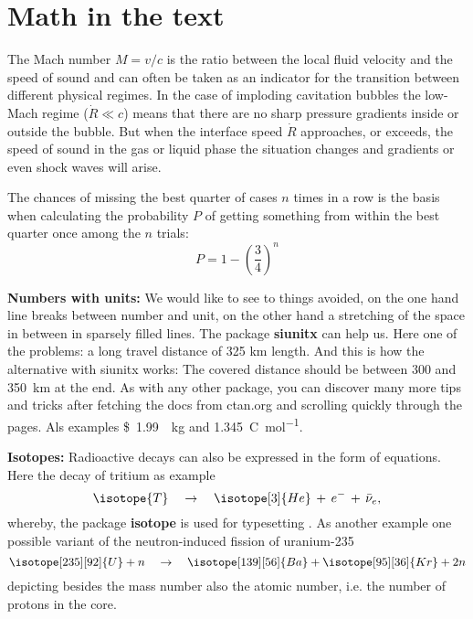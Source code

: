 \chapter{Math in the text}%

The Mach number $M=v/c$ is the ratio between the local fluid velocity and the speed of sound and can often be taken as an indicator for the transition between different physical regimes. In the case of imploding cavitation bubbles the low-Mach regime ($\dot{R}\ll c$) means that there are no sharp pressure gradients inside or outside the bubble. But when the interface speed $\dot{R}$ approaches, or exceeds, the speed of sound in the gas or liquid phase the situation changes and gradients or even shock waves will arise.

The chances of missing the best quarter of cases $n$ times in a row is the basis when calculating the probability $P$ of getting something from within the best quarter once among the $n$ trials:
\begin{equation}
P=1-\left( \frac{3}{4} \right)^n
\end{equation}


\textbf{Numbers with units:} We would like to see to things avoided, on the one hand line breaks between number and unit, on the other hand a stretching of the space in between in sparsely filled lines. The package \textbf{siunitx} can help us. Here one of the problems: a long travel distance of 325 km length. And this is how the alternative with siunitx works: The covered distance should be between \num{300} and \SI{350}{\kilo\meter} at the end. As with any other package, you can discover many more tips and tricks after fetching the docs from ctan.org and scrolling quickly through the pages. Als examples \SI[per-mode=symbol]{1.99}[\$]{\per\kilogram} and \SI[per-mode=fraction]{1,345}{\coulomb\per\mole}.

\textbf{Isotopes:} Radioactive decays can also be expressed in the form of equations. Here the decay of tritium as example
\begin{equation}
  \isotope{T}  \quad \rightarrow \quad \isotope[3]{He}\,+\,e^{-}\,+\,\bar{\nu}_e,  \label{eq_T_decay}
\end{equation}
whereby, the package \textbf{isotope} is used for typesetting . As another example one possible variant of the neutron-induced fission of uranium-235
\begin{equation}
  \isotope[235][92]{U} + n \quad \rightarrow \quad \isotope[139][56]{Ba} + \isotope[95][36]{Kr} + 2n
\end{equation}
depicting besides the mass number also the atomic number, i.e. the number of protons in the core.


